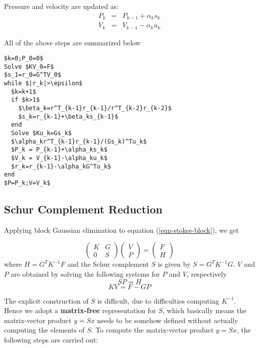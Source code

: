 \documentclass[10pt,letterpaper]{article}
\begin{document}
Pressure and velocity are updated as:
\begin{eqnarray}\label{eqn-55}
P_k &=& P_{k-1}+\alpha_ks_k\\
V_k &=& V_{k-1}-\alpha_ku_k
\end{eqnarray}

All of the above steps are summarized below
\begin{lstlisting}[frame=tb,mathescape,caption=Uzawa algorithm]
$k=0;P_0=0$
Solve $KV_0=F$
$s_1=r_0=G^TV_0$
while $|r_k|>\epsilon$ 
  $k=k+1$
  if $k>1$
    $\beta_k=r^T_{k-1}r_{k-1}/r^T_{k-2}r_{k-2}$
    $s_k=r_{k-1}+\beta_ks_{k-1}$
  end
  Solve $Ku_k=Gs_k$
  $\alpha_kr^T_{k-1}r_{k-1}/(Gs_k)^Tu_k$
  $P_k = P_{k-1}+\alpha_ks_k$
  $V_k = V_{k-1}-\alpha_ku_k$
  $r_k=r_{k-1}-\alpha_kG^Tu_k$
end
$P=P_k;V=V_k$	
\end{lstlisting}



\subsection{Schur Complement Reduction}
Applying block Gaussian elimination to equation (\ref{eqn-stokes-block}), we
get

\begin{equation}\label{eqn-g4.21}
\begin{pmatrix}
K & G \\ 
0 & S
\end{pmatrix} 
\begin{pmatrix}
V \\ 
P
\end{pmatrix}
=
\begin{pmatrix}
F \\ 
H
\end{pmatrix}
\end{equation}
where $H=G^TK^{-1}F$ and the Schur complement $S$ is given by $S=G^TK^{-1}G$.
$V$ and $P$ are obtained by solving the following systems for $P$ and $V$,
respectively
\begin{equation}\label{eqn-g4.22}
SP=H
\end{equation}
\begin{equation}\label{eqn-g4.23}
KV=F-GP
\end{equation}

The explicit construction of $S$ is difficult, due to difficulties computing
$K^{-1}$. Hence we adopt a \textbf{matrix-free} representation for $S$, which
basically means the matrix-vector product $y=Sx$ needs to be somehow defined
without actually computing the elements of $S$. To compute the matrix-vector
product $y=Sx$, the following steps are carried out:
\end{document}

